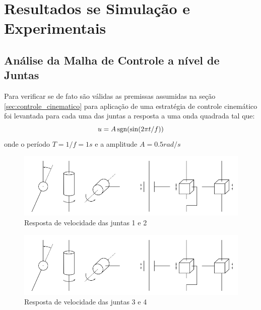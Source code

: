 \chapter{Resultados se Simulação e Experimentais}

\section{Análise da Malha de Controle a nível de Juntas}
Para verificar se de fato são válidas as premissas assumidas na seção \ref{sec:controle_cinematico} para aplicação de uma estratégia de controle cinemático foi levantada para cada uma das juntas a resposta a uma onda quadrada tal que:
\[ u = A \operatorname{sgn}(\sin( 2\pi t/f)) \]
onde o período $T = 1/f = 1s$ e a amplitude $A = 0.5 rad/s$

\newlength{\imageheight}
\begin{figure}[H]
  \centering
    \includegraphics[width=\textwidth, clip=true, trim = 0 0.5\imageheight 0 0 0 mm]{./img/joints}
  \caption{Resposta de velocidade das juntas 1 e 2}
\end{figure}

\begin{figure}[H]
  \centering
    \includegraphics[width=\textwidth, clip=true, trim = 0 0 0 0.5\imageheight 0 mm]{./img/joints}
  \caption{Resposta de velocidade das juntas 3 e 4}
\end{figure}


